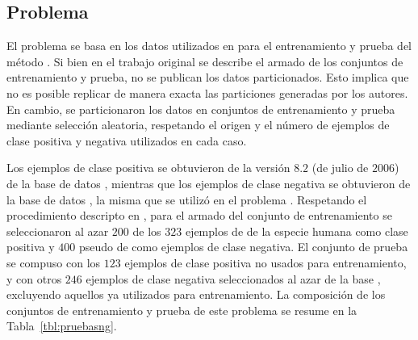 %
%
\subsection{Problema \mipred{}}
%
El problema \prob\mipred{} se basa en los datos utilizados en
\cite{ng} para el entrenamiento y prueba del método \work\mipred{}.
Si bien en el trabajo original se describe el armado de los conjuntos
de entrenamiento y prueba, no se publican los datos particionados.
Esto implica que no es posible replicar de manera exacta las
particiones generadas por los autores.
En cambio, se particionaron los datos en conjuntos de entrenamiento y
prueba mediante selección aleatoria, respetando el origen y el número
de ejemplos de clase positiva y negativa utilizados en cada caso.

Los ejemplos de clase positiva se obtuvieron de la versión $8$.$2$ (de
julio de $2006$) de la base de datos \dset{\mirbase}, mientras que los
ejemplos de clase negativa se obtuvieron de la base de datos
, la misma que se utilizó en el problema
\prob\tripletsvm{}.
Respetando el procedimiento descripto en \cite{ng}, para el armado del
conjunto de entrenamiento  se seleccionaron al azar $200$
de los $323$ ejemplos de  de la especie humana como clase
positiva y $400$ pseudo  de  como ejemplos de
clase negativa.
El conjunto de prueba  se compuso con los $123$ ejemplos de
clase positiva no usados para entrenamiento, y con otros $246$
ejemplos de clase negativa seleccionados al azar de la base
, excluyendo aquellos ya utilizados para entrenamiento.
La composición de los conjuntos de entrenamiento y prueba de este
problema se resume en la Tabla~\ref{tbl:pruebasng}.
